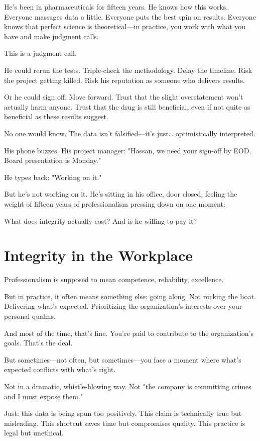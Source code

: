 \documentclass[11pt,twoside]{book}
\begin{document}
He's been in pharmaceuticals for fifteen years. He knows how this works. Everyone massages data a little. Everyone puts the best spin on results. Everyone knows that perfect science is theoretical—in practice, you work with what you have and make judgment calls.

This is a judgment call.

He could rerun the tests. Triple-check the methodology. Delay the timeline. Risk the project getting killed. Risk his reputation as someone who delivers results.

Or he could sign off. Move forward. Trust that the slight overstatement won't actually harm anyone. Trust that the drug is still beneficial, even if not quite as beneficial as these results suggest.

No one would know. The data isn't falsified—it's just\ldots{} optimistically interpreted.

His phone buzzes. His project manager: "Hassan, we need your sign-off by EOD. Board presentation is Monday."

He types back: "Working on it."

But he's not working on it. He's sitting in his office, door closed, feeling the weight of fifteen years of professionalism pressing down on one moment:

What does integrity actually cost? And is he willing to pay it?

\section*{Integrity in the Workplace}

Professionalism is supposed to mean competence, reliability, excellence.

But in practice, it often means something else: going along. Not rocking the boat. Delivering what's expected. Prioritizing the organization's interests over your personal qualms.

And most of the time, that's fine. You're paid to contribute to the organization's goals. That's the deal.

But sometimes—not often, but sometimes—you face a moment where what's expected conflicts with what's right.

Not in a dramatic, whistle-blowing way. Not "the company is committing crimes and I must expose them."

Just: this data is being spun too positively. This claim is technically true but misleading. This shortcut saves time but compromises quality. This practice is legal but unethical.
\end{document}
